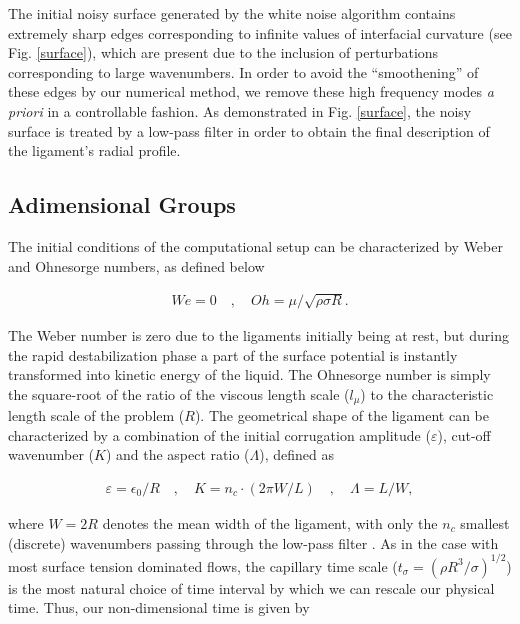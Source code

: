 The initial noisy surface generated by the white noise algorithm
contains extremely sharp edges corresponding to infinite values of 
interfacial curvature (see Fig. \ref{surface}), which are present due
to the inclusion of perturbations corresponding to large wavenumbers. 
In order to avoid the ``smoothening'' of these edges by our numerical method,   
we remove these high frequency modes \textit{a priori} in a controllable fashion. 
As demonstrated in Fig. \ref{surface}, the noisy surface is treated by a low-pass filter 
in order to obtain the final description of the ligament's radial profile. 


\subsection*{Adimensional Groups}

The initial conditions of the computational setup can be 
characterized by Weber and Ohnesorge numbers, as defined below   

\begin{align}
	We = 0 \quad , \quad Oh = \mu / \sqrt{\rho \sigma R} . 
\end{align}

The Weber number is zero due to the ligaments initially being at rest, 
but during the rapid destabilization phase a part of the surface 
potential is instantly transformed into kinetic energy of the liquid.  
The Ohnesorge number is simply the square-root of the ratio  
of the viscous length scale ($l_\mu$)  
to the characteristic length scale of the problem ($R$).
The geometrical shape of the ligament can 
be characterized by a combination of the initial
corrugation amplitude ($\varepsilon$),
cut-off wavenumber ($K$) and the aspect ratio ($\Lambda$), defined as   

\begin{align}
 \varepsilon = \epsilon_0 / R \quad , \quad K = n_c \cdot \left(2\pi W/ L \right) \quad
	, \quad \Lambda = L / W , 
\end{align}

where $W = 2R$ denotes the mean width of the ligament, with only
the $n_c$ smallest (discrete) wavenumbers passing through the low-pass filter .
As in the case with most surface tension dominated flows, 
the capillary time scale ($t_\sigma = (\rho R^3 / \sigma)^{1/2}$) is the most 
natural choice of time interval by which we can rescale our physical time.
Thus, our non-dimensional time is given by 

